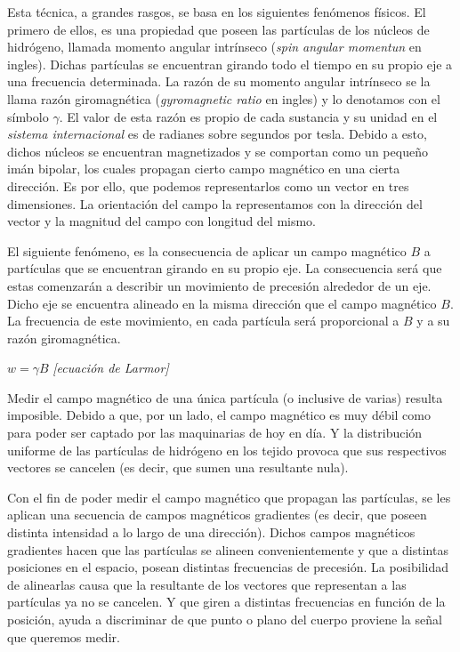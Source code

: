 \documentclass[11pt,a4paper,twoside]{tesis}
\begin{document}
Esta t\'ecnica, a grandes rasgos, se basa en los siguientes fen\'omenos f\'isicos. El primero de 
ellos, es 
una propiedad que poseen las part\'iculas de los n\'ucleos de hidr\'ogeno, 
llamada momento angular intrínseco (\textit{spin angular momentun} en ingles). 
Dichas part\'iculas se encuentran girando todo el tiempo en su 
propio eje a una frecuencia determinada. La razón de su  momento 
angular intrínseco se la llama razón giromagnética (\textit{gyromagnetic 
ratio} en ingles) y lo denotamos con el símbolo $\gamma$. El valor de esta 
razón es propio de cada sustancia y su unidad en el 
\textit{sistema internacional} es de radianes sobre segundos por tesla. Debido 
a esto, dichos n\'ucleos se encuentran 
magnetizados y se comportan como un peque\~no im\'an bipolar, los cuales 
propagan cierto campo 
magn\'etico en una cierta direcci\'on. Es por ello, que podemos representarlos como un vector en 
tres dimensiones. La orientaci\'on del campo la representamos con la direcci\'on del vector y la 
magnitud del campo con longitud del mismo.

El siguiente fen\'omeno, es la consecuencia de aplicar un campo 
magnético $B$ a partículas que se encuentran girando en su propio 
eje. La consecuencia será que estas comenzarán a describir un movimiento de 
precesi\'on alrededor de un eje. Dicho eje se encuentra alineado en la misma 
direcci\'on que el campo magn\'etico $B$. La frecuencia de este movimiento, en 
cada part\'icula será proporcional a $B$ y a su razón giromagnética.

\begin{center}
$w=\gamma  B $    \textit{[ecuación de Larmor]}
\end{center}


Medir el campo magn\'etico de una \'unica part\'icula (o inclusive de varias) resulta imposible. 
Debido a que, por un lado, el campo magn\'etico es muy d\'ebil como para poder ser captado por las 
maquinarias de hoy en d\'ia. Y la distribuci\'on uniforme de las part\'iculas 
de 
hidr\'ogeno en los tejido provoca que sus respectivos vectores se cancelen (es decir, que sumen una 
resultante nula). 

Con el fin de poder medir el campo magnético que propagan 
las partículas, se les aplican una secuencia de campos magn\'eticos gradientes 
(es decir, que poseen distinta intensidad a lo largo de una direcci\'on). 
Dichos campos magn\'eticos gradientes hacen que las part\'iculas se alineen 
convenientemente y que 
a distintas posiciones en el espacio, posean distintas frecuencias de 
precesi\'on. La posibilidad de 
alinearlas causa que la resultante de los vectores que representan a las part\'iculas ya no se 
cancelen. Y que giren a distintas frecuencias en funci\'on de la posici\'on, 
ayuda a discriminar de que punto o plano del cuerpo proviene la se\~nal que 
queremos medir.
\end{document}
